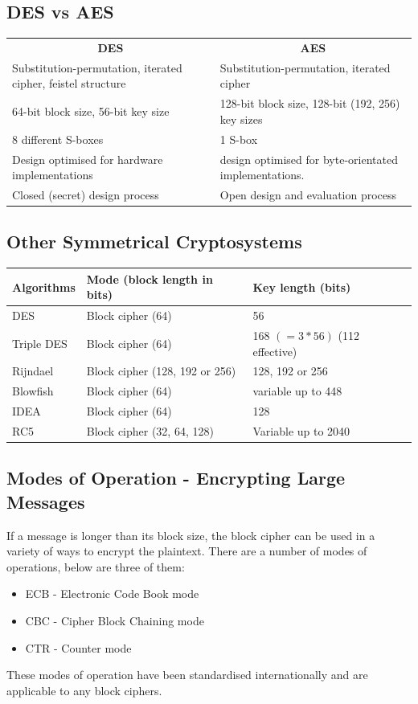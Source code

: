 \documentclass{article}
\begin{document}
\subsection{DES vs AES}
\begin{center}
	\begin{tabular}{p{6cm}p{6cm}}
		\multicolumn{1}{c}{\textbf{DES}} & \multicolumn{1}{c}{\textbf{\textbf{AES}}} \\
		Substitution-permutation, iterated cipher, feistel structure & Substitution-permutation, iterated cipher \\
		64-bit block size, 56-bit key size & 128-bit block size, 128-bit (192, 256) key sizes \\
		8 different S-boxes & 1 S-box \\
		Design optimised for hardware implementations & design optimised for byte-orientated implementations. \\
		Closed (secret) design process & Open design and evaluation process \\
	\end{tabular}
\end{center}

\subsection{Other Symmetrical Cryptosystems}
\begin{center}
	\begin{tabular}{|l|l|l|}
	\hline
	Algorithms & Mode (block length in bits) & Key length (bits) \\ \hline
	DES & Block cipher (64) & 56 \\ \hline
	Triple DES & Block cipher (64) & 168 $(=3*56)$ (112 effective) \\ \hline
	Rijndael & Block cipher (128, 192 or 256) & 128, 192 or 256 \\ \hline
	Blowfish & Block cipher (64) & variable up to 448 \\ \hline
	IDEA & Block cipher (64) & 128 \\ \hline
	RC5 & Block cipher (32, 64, 128) & Variable up to 2040 \\
	\hline
	\end{tabular}
\end{center}

\subsection{Modes of Operation - Encrypting Large Messages}
If a message is longer than its block size, the block cipher can be used in a variety of ways to encrypt the plaintext. There are a number of modes of operations, below are three of them:
\begin{itemize}
	\item ECB - Electronic Code Book mode
	\item CBC - Cipher Block Chaining mode
	\item CTR - Counter mode
\end{itemize}
These modes of operation have been standardised internationally and are applicable to any block ciphers.
\end{document}
